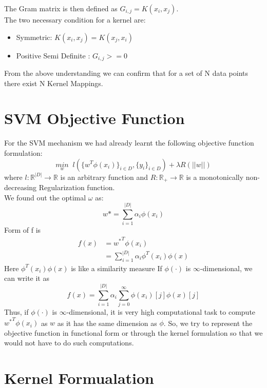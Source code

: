 \documentclass[12pt]{article}
\begin{document}
The Gram matrix is then defined as $ G_{i,j} = K(x_{i},x_{j}) $.\\
The two necessary condition for a kernel are: \\
\begin{itemize}
    \item Symmetric: $ K(x_{i}, x_{j}) = K(x_{j}, x_{i}) $
    \item Positive Semi Definite : $G_{i,j} >= 0$
\end{itemize} 

From the above understanding we can confirm that for a set of N data points there exist N Kernel Mappings.

\section{SVM Objective Function}

For the SVM mechanism we had already learnt the following objective function formulation: \\
\begin{equation}
    \label{loss_function}
    \underset{w}{min} \; \; l (\{w^{T}\phi(x_{i})\}_{i \in D}, \{y_{i}\}_{i \in D} ) + \lambda R(||w||)
\end{equation}
where $l : \mathbb{R}^{|D|} \rightarrow \mathbb{R}$ is an arbitrary function and $R : \mathbb{R}_{+} \rightarrow \mathbb{R}$ is a monotonically non-decreasing Regularization function.\\

We found out the optimal $\omega$ as:\\
\[w* = \sum_{i=1}^{|D|} \alpha_{i} \phi(x_{i})\]
Form of f is 
\begin{align*}
    f(x) &= {w^{*}}^{T}\phi(x_{i})  \\
        &= \sum_{i = 1}^{|D|} \alpha_{i} \phi^{T}(x_{i}) \phi(x)
\end{align*}
Here $\phi^{T}(x_{i}) \phi(x)$ is like a similarity measure
If $\phi(\cdot)$ is $\infty$-dimensional, we can write it as 
\[ f(x) =  \sum_{i = 1}^{|D|} \alpha_{i} \sum_{j=0}^{\infty} \phi(x_{i})[j] \phi(x)[j]\]
Thus, if $\phi(\cdot)$ is $\infty$-dimensional, it is very high computational task to compute $ {w^{*}}^{T}\phi(x_{i}) $ as $w$ as it has the same 
dimension as $\phi$. So, we try to represent the objective function in functional form or through the kernel formulation so that we would not have to do such computations.
 


\section{Kernel Formualation}
\end{document}
